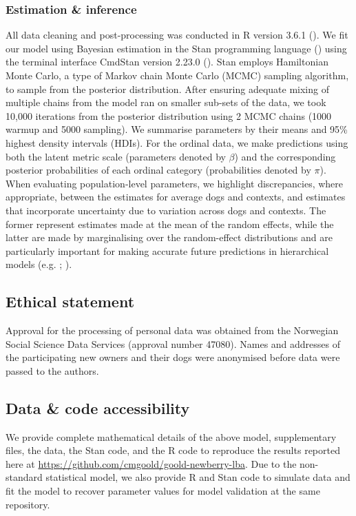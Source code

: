 \documentclass[12pt]{article}
\begin{document}
\subsubsection{Estimation \& inference}
All data cleaning and post-processing was conducted in R version 3.6.1 (\cite{rcoreteam2019}). We fit our model using Bayesian estimation in the Stan programming language (\cite{stan2018}) using the terminal interface CmdStan version 2.23.0 (\cite{cmdstan2018}). Stan employs Hamiltonian Monte Carlo, a type of Markov chain Monte Carlo (MCMC) sampling algorithm, to sample from the posterior distribution. After ensuring adequate mixing of multiple chains from the model ran on smaller sub-sets of the data, we took 10,000 iterations from the posterior distribution using 2 MCMC chains (1000 warmup and 5000 sampling). We summarise parameters by their means and 95\% highest density intervals (HDIs). For the ordinal data, we make predictions using both the latent metric scale (parameters denoted by $\beta$) and the corresponding posterior probabilities of each ordinal category (probabilities denoted by $\pi$). When evaluating population-level parameters, we highlight discrepancies, where appropriate, between the estimates for average dogs and contexts, and estimates that incorporate uncertainty due to variation across dogs and contexts. The former represent estimates made at the mean of the random effects, while the latter are made by marginalising over the random-effect distributions and are particularly important for making accurate future predictions in hierarchical models (e.g. \cite{inthout2016}; \cite{wang2019}).

\subsection{Ethical statement}
Approval for the processing of personal data was obtained from the Norwegian Social Science Data Services (approval number 47080). Names and addresses of the participating new owners and their dogs were anonymised before data were passed to the authors.

\subsection{Data \& code accessibility}
We provide complete mathematical details of the above model, supplementary files, the data, the Stan code, and the R code to reproduce the results reported here at  \url{https://github.com/cmgoold/goold-newberry-lba}. Due to the non-standard statistical model, we also provide R and Stan code to simulate data and fit the model to recover parameter values for model validation at the same repository.
\end{document}
